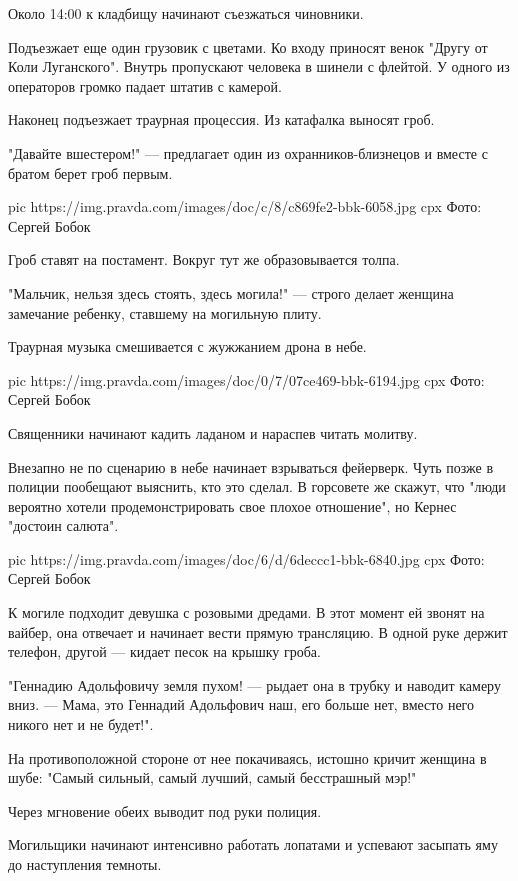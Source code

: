 Около 14:00 к кладбищу начинают съезжаться чиновники. 

Подъезжает еще один грузовик с цветами. Ко входу приносят венок "Другу от Коли
Луганского". Внутрь пропускают человека в шинели с флейтой. У одного из
операторов громко падает штатив с камерой. 

Наконец подъезжает траурная процессия. Из катафалка выносят гроб.

"Давайте вшестером!" — предлагает один из охранников-близнецов и вместе с
братом берет гроб первым.

\ifcmt
pic https://img.pravda.com/images/doc/c/8/c869fe2-bbk-6058.jpg
cpx Фото: Сергей Бобок
\fi

Гроб ставят на постамент. Вокруг тут же образовывается толпа. 

"Мальчик, нельзя здесь стоять, здесь могила!" — строго делает женщина замечание
ребенку, ставшему на могильную плиту.

Траурная музыка смешивается с жужжанием дрона в небе.

\ifcmt
pic https://img.pravda.com/images/doc/0/7/07ce469-bbk-6194.jpg
cpx Фото: Сергей Бобок
\fi

Священники начинают кадить ладаном и нараспев читать молитву.

Внезапно не по сценарию в небе начинает взрываться фейерверк. Чуть позже в
полиции пообещают выяснить, кто это сделал. В горсовете же скажут, что "люди
вероятно хотели продемонстрировать свое плохое отношение", но Кернес "достоин
салюта".

\ifcmt
pic https://img.pravda.com/images/doc/6/d/6deccc1-bbk-6840.jpg
cpx Фото: Сергей Бобок
\fi

К могиле подходит девушка с розовыми дредами. В этот момент ей звонят на
вайбер, она отвечает и начинает вести прямую трансляцию. В одной руке держит
телефон, другой — кидает песок на крышку гроба. 

"Геннадию Адольфовичу земля пухом! — рыдает она в трубку и наводит камеру вниз.
— Мама, это Геннадий Адольфович наш, его больше нет, вместо него никого нет и
не будет!".

На противоположной стороне от нее покачиваясь, истошно кричит женщина в шубе:
"Самый сильный, самый лучший, самый бесстрашный мэр!"

Через мгновение обеих выводит под руки полиция.

Могильщики начинают интенсивно работать лопатами и успевают засыпать яму до
наступления темноты.

